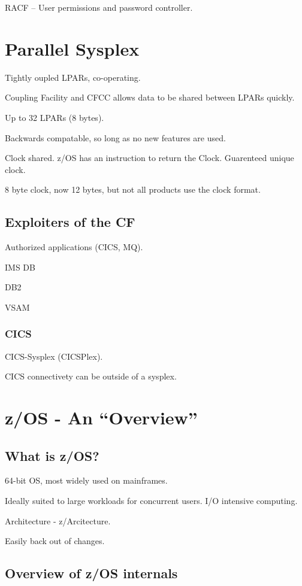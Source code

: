 \documentclass{report}
\begin{document}
RACF -- User permissions and password controller.

\section{Parallel Sysplex}
Tightly oupled LPARs, co-operating.

Coupling Facility and CFCC allows data to be shared between LPARs quickly.

Up to 32 LPARs (8 bytes).

Backwards compatable, so long as no new features are used.

Clock shared. z/OS has an instruction to return the Clock. Guarenteed unique clock.

8 byte clock, now 12 bytes, but not all products use the clock format.

\subsection{Exploiters of the CF}

Authorized applications (CICS, MQ).

IMS DB

DB2

VSAM

\subsubsection{CICS}

CICS-Sysplex (CICSPlex).

CICS connectivety can be outside of a sysplex.

\section{z/OS - An ``Overview''}

\subsection{What is z/OS?}

64-bit OS, most widely used on mainframes.

Ideally suited to large workloads for concurrent users. I/O intensive computing.

Architecture - z/Arcitecture.

Easily back out of changes.

\subsection{Overview of z/OS internals}
\end{document}
